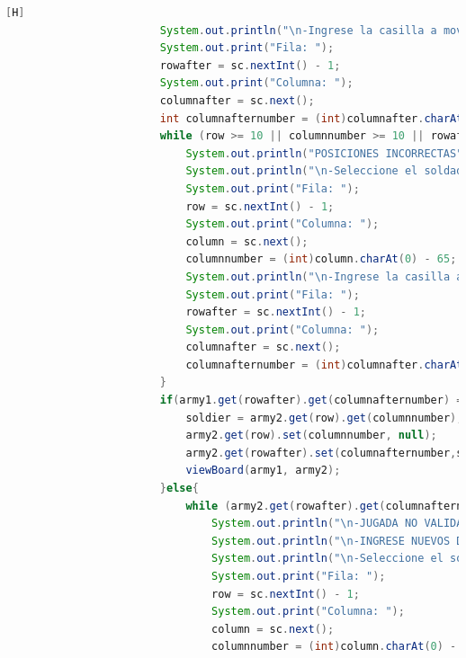 \documentclass{article}
\begin{document}
\begin{lstlisting}[language=java,caption={Las lineas de codigos del metodo creado:}][H]
						System.out.println("\n-Ingrese la casilla a mover");
						System.out.print("Fila: ");
						rowafter = sc.nextInt() - 1;
						System.out.print("Columna: ");
						columnafter = sc.next();
						int columnafternumber = (int)columnafter.charAt(0) - 65; 
						while (row >= 10 || columnnumber >= 10 || rowafter >= 10 || columnafternumber >= 10) {
							System.out.println("POSICIONES INCORRECTAS");
							System.out.println("\n-Seleccione el soldado: ");
							System.out.print("Fila: ");
							row = sc.nextInt() - 1;
							System.out.print("Columna: ");
							column = sc.next();
							columnnumber = (int)column.charAt(0) - 65; 
							System.out.println("\n-Ingrese la casilla a mover");
							System.out.print("Fila: ");
							rowafter = sc.nextInt() - 1;
							System.out.print("Columna: ");
							columnafter = sc.next();
							columnafternumber = (int)columnafter.charAt(0) - 65;  
						}
						if(army1.get(rowafter).get(columnafternumber) == null && army2.get(rowafter).get(columnafternumber) == null){
							soldier = army2.get(row).get(columnnumber);
							army2.get(row).set(columnnumber, null);
							army2.get(rowafter).set(columnafternumber,soldier);
							viewBoard(army1, army2);
						}else{
							while (army2.get(rowafter).get(columnafternumber) != null){
								System.out.println("\n-JUGADA NO VALIDA");
								System.out.println("\n-INGRESE NUEVOS DATOS");
								System.out.println("\n-Seleccione el soldado: ");
								System.out.print("Fila: ");
								row = sc.nextInt() - 1;
								System.out.print("Columna: ");
								column = sc.next();
								columnnumber = (int)column.charAt(0) - 65; 
	

\end{lstlisting}
\end{document}
